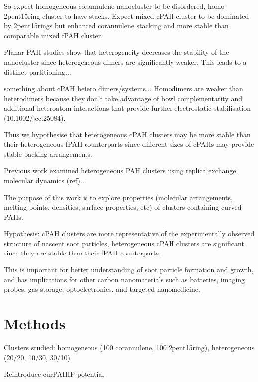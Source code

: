 So expect homogeneous corannulene nanocluster to be disordered, homo 2pent15ring cluster to have stacks. Expect mixed cPAH cluster to be dominated by 2pent15rings but enhanced corannulene stacking and more stable than comparable mixed fPAH cluster.


Planar PAH studies show that heterogeneity decreases the stability of the nanocluster since heterogeneous dimers are significantly weaker.  This leads to a distinct partitioning...

something about cPAH hetero dimers/systems...
Homodimers are weaker than heterodimers because they don't take advantage of bowl complementarity and additional heteroatom interactions that provide further electrostatic stabilisation (10.1002/jcc.25084).

Thus we hypothesise that heterogeneous cPAH clusters may be more stable than their heterogeneous fPAH counterparts since different sizes of cPAHs may provide stable packing arrangements.





Previous work examined heterogeneous PAH clusters using replica exchange molecular dynamics (ref)...

The purpose of this work is to explore properties (molecular arrangements, melting points, densities, surface properties, etc) of clusters containing curved PAHs.  

Hypothesis: cPAH clusters are more representative of the experimentally observed structure of nascent soot particles, heterogeneous cPAH clusters are significant since they are stable than their fPAH counterparts.

This is important for better understanding of soot particle formation and growth, and has implications for other carbon nanomaterials such as batteries, imaging probes, gas storage, optoelectronics, and targeted nanomedicine.

\section{Methods}
Clusters studied: homogeneous (100 corannulene, 100 2pent15ring), heterogeneous (20/20, 10/30, 30/10)

Reintroduce curPAHIP potential

